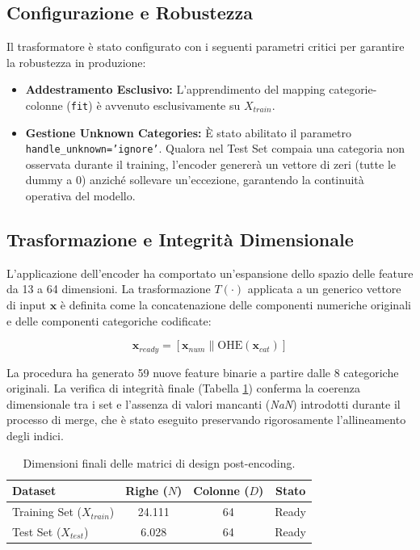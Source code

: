 \subsection{Configurazione e Robustezza}
Il trasformatore è stato configurato con i seguenti parametri critici per garantire la robustezza in produzione:
\begin{itemize}
    \item \textbf{Addestramento Esclusivo:} L'apprendimento del mapping categorie-colonne (\texttt{fit}) è avvenuto esclusivamente su $X_{train}$.
    \item \textbf{Gestione Unknown Categories:} È stato abilitato il parametro \texttt{handle\_unknown='ignore'}. Qualora nel Test Set compaia una categoria non osservata durante il training, l'encoder genererà un vettore di zeri (tutte le dummy a 0) anziché sollevare un'eccezione, garantendo la continuità operativa del modello.
\end{itemize}

\subsection{Trasformazione e Integrità Dimensionale}

L'applicazione dell'encoder ha comportato un'espansione dello spazio delle feature da 13 a 64 dimensioni.
La trasformazione $T(\cdot)$ applicata a un generico vettore di input $\mathbf{x}$ è definita come la concatenazione delle componenti numeriche originali e delle componenti categoriche codificate:

\begin{equation}
    \mathbf{x}_{ready} = \left[ \mathbf{x}_{num} \parallel \text{OHE}(\mathbf{x}_{cat}) \right]
\end{equation}

\noindent
La procedura ha generato 59 nuove feature binarie a partire dalle 8 categoriche originali.
La verifica di integrità finale (Tabella \ref{tab:encoding_dims}) conferma la coerenza dimensionale tra i set e l'assenza di valori mancanti (\textit{NaN}) introdotti durante il processo di merge, che è stato eseguito preservando rigorosamente l'allineamento degli indici.

\newpage
\begin{table}[h]
\centering
\begin{tabular}{lccc}
\toprule
\textbf{Dataset} & \textbf{Righe ($N$)} & \textbf{Colonne ($D$)} & \textbf{Stato} \\
\midrule
Training Set ($X_{train}$) & 24.111 & 64 & Ready \\
Test Set ($X_{test}$) & 6.028 & 64 & Ready \\
\bottomrule
\end{tabular}
\caption{Dimensioni finali delle matrici di design post-encoding.}
\label{tab:encoding_dims}
\end{table}

\newpage
